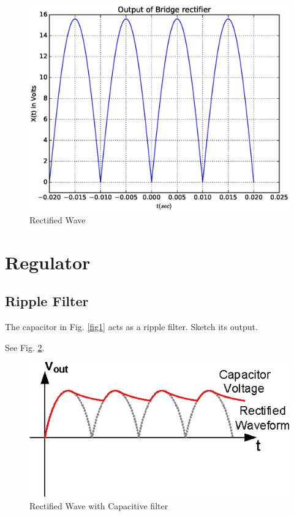 \documentclass[journal,12pt,twocolumn]{IEEEtran}
\begin{document}
\begin{figure}[!ht]
\centering
	\includegraphics[width=\columnwidth]{./figs/sine.eps}
	\caption{Rectified Wave}  \label{fig2}
    \end{figure}

\section{Regulator}
\subsection{Ripple Filter}
\begin{problem}
The capacitor in Fig. \ref{fig1} acts as a ripple filter.  Sketch its output.
\end{problem}
\solution
See  Fig. \ref{fig3}.

\begin{figure}[!ht]
\centering
	\includegraphics[width=\columnwidth]{./figs/cap.eps}
	\caption{Rectified Wave with Capacitive filter}  \label{fig3}
    \end{figure}
\end{document}
